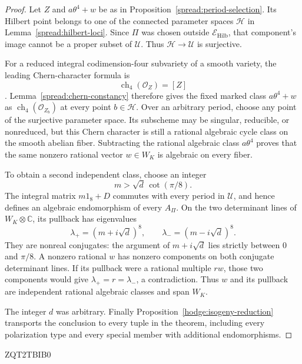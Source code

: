 \documentclass[11pt]{article}
\theoremstyle{definition}
\theoremstyle{remark}
\numberwithin{equation}{section}
\begin{document}
\begin{proof}
Let $Z$ and $a\theta^4+w$ be as in
Proposition~\ref{spread:period-selection}.  Its Hilbert point belongs
to one of the connected parameter spaces $\mathcal H$ in
Lemma~\ref{spread:hilbert-loci}.  Since $\Pi$ was chosen outside
$\mathcal E_{\mathrm{Hilb}}$, that component's image cannot be a
proper subset of $\mathcal U$.  Thus $\mathcal H\to\mathcal U$
is surjective.

For a reduced integral codimension-four subvariety of a smooth variety,
the leading Chern-character formula is
\[
 \operatorname{ch}_4(\mathcal O_Z)=[Z]
\]
\cite{fulton-intersection}.  Lemma~\ref{spread:chern-constancy}
therefore gives the fixed marked class $a\theta^4+w$ as
$\operatorname{ch}_4(\mathcal O_{Z_b})$ at every point $b\in\mathcal H$.
Over an arbitrary period, choose any point of the surjective parameter
space.  Its subscheme may be singular, reducible, or nonreduced, but
this Chern character is still a rational algebraic cycle class on the
smooth abelian fiber.  Subtracting the rational algebraic class
$a\theta^4$ proves that the same nonzero rational vector $w\in W_K$
is algebraic on every fiber.

To obtain a second independent class, choose an integer
\[
 m>\sqrt d\,\cot(\pi/8).
\]
The integral matrix $m1_8+D$ commutes with every period in $\mathcal U$,
and hence defines an algebraic endomorphism of every $A_\Pi$.  On the
two determinant lines of $W_K\otimes\mathbb C$, its pullback has eigenvalues
\[
 \lambda_+=(m+i\sqrt d)^8,\qquad
 \lambda_-=(m-i\sqrt d)^8.
\]
They are nonreal conjugates: the argument of $m+i\sqrt d$ lies
strictly between $0$ and $\pi/8$.  A nonzero rational $w$ has nonzero
components on both conjugate determinant lines.  If its pullback were
a rational multiple $r w$, those two components would give
$\lambda_+=r=\lambda_-$, a contradiction.  Thus $w$ and its pullback
are independent rational algebraic classes and span $W_K$.

The integer $d$ was arbitrary.  Finally
Proposition~\ref{hodge:isogeny-reduction} transports the conclusion
to every tuple in the theorem, including every polarization type and
every special member with additional endomorphisms.
\end{proof}



ZQT2TBIB0
\end{document}
